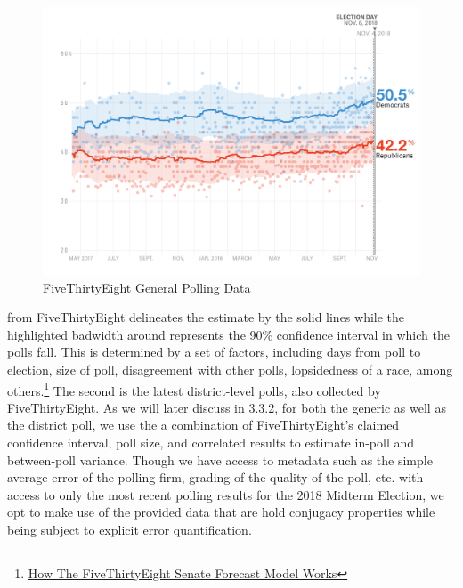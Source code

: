 \documentclass[11pt]{article}
\begin{document}
 \begin{figure}[tbh]
  \centering
  \includegraphics[scale=0.45]{general_polling}
  \caption{FiveThirtyEight General Polling Data}
  \label{fig:genpolls}
\end{figure}

  from FiveThirtyEight delineates the estimate by the solid lines while the highlighted badwidth around represents the 90\% confidence interval in which the polls fall. This is determined by a set of factors, including days from poll to election, size of poll, disagreement with other polls, lopsidedness of a race, among others.\footnote{\href{https://fivethirtyeight.com/features/how-the-fivethirtyeight-senate-forecast-model-works/}{How The FiveThirtyEight Senate Forecast Model Works}} The second is the latest district-level polls, also collected by FiveThirtyEight. As we will later discuss in 3.3.2, for both the generic as well as the district poll, we use the a combination of FiveThirtyEight's claimed confidence interval, poll size, and correlated results to estimate in-poll and between-poll variance. Though we have access to metadata such as the simple average error of the polling firm, grading of the quality of the poll, etc. with access to only the most recent polling results for the 2018 Midterm Election, we opt to make use of the provided data that are hold conjugacy properties while being subject to explicit error quantification.
\end{document}

